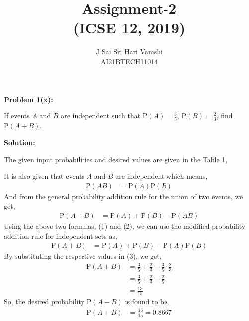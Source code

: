 \documentclass[journal,12pt,twocolumn]{article}\usepackage[margin=1.25 in]{geometry}
\title{\LARGE{\textbf{Assignment-2}\\(ICSE 12, 2019)}}
\author{\normalsize J Sai Sri Hari Vamshi\\ \footnotesize AI21BTECH11014}
\date{}
\providecommand{\pr}[1]{\ensuremath{\text{P}\left(#1\right)}}
\begin{document}
\maketitle
\begin{center}
    \textbf{\large Problem 1(x):}
\end{center}
\noindent If events $A$ and $B$ are independent such that $\pr{A} = \frac{3}{5}$, $\pr{B} = \frac{2}{3}$, find $\pr{A + B}$.

\begin{center}
    \textbf{\large Solution:}
\end{center}

\noindent The given input probabilities and desired values are given in the Table 1,
\begin{center}
\begin{table}[h!]
\label{table:table1}

\caption{}
\end{table}
\end{center}
\noindent It is also given that events $A$ and $B$ are independent which means,
\begin{align}
\pr{AB} & = \pr A \pr B
\end{align}
\noindent And from the general probability addition rule for the union of two events, we get,
\begin{align}
\pr{A + B} & = \pr A + \pr B - \pr{AB}
\end{align}
\noindent Using the above two formulas, (1) and (2), we can use the modified probability addition rule for independent sets as,
\begin{align}
\pr{A + B} & = \pr A + \pr B - \pr A \pr B
\end{align}
\noindent By substituting the respective values in (3), we get,
\begin{align*}
\pr{A + B} & = \frac{3}{5} + \frac{2}{3} - \frac{3}{5} \cdot \frac{2}{3} \\
& = \frac{3}{5} + \frac{2}{3} - \frac{2}{5}\\
& = \frac{13}{15}
\end{align*}
\noindent So, the desired probability $\pr{A + B}$ is found to be,
\begin{align*}
\pr{A + B} & = \frac{13}{15} = 0.8667
\end{align*}
\end{document}
